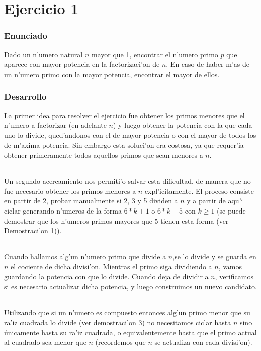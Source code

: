 \part{Ejercicio 1}
\section{Enunciado}
Dado un n'umero natural $n$ mayor que 1, encontrar el n'umero primo $p$ que aparece con mayor potencia en la factorizaci'on 
de $n$. En caso de haber m'as de un n'umero primo con  la mayor potencia, encontrar el mayor de ellos.

\section{Desarrollo}
La primer idea para resolver el ejercicio fue obtener los primos menores que el n'umero a factorizar
(en adelante $n$) y luego obtener la potencia con la que cada uno lo divide, qued'andonos con el de mayor
potencia o con el mayor de todos los de m'axima potencia. Sin embargo esta soluci'on era costosa, ya que
requer'ia obtener primeramente todos aquellos primos que sean menores a $n$.
\paragraph{}
Un segundo acercamiento nos permiti'o salvar esta dificultad, de manera que no fue necesario obtener 
los primos menores a $n$ expl'icitamente. El proceso consiste en partir de 2, probar manualmente si 2, 3 y 5 
dividen a $n$ y a partir  de aqu'i ciclar generando n'umeros de la forma $6*k + 1$ o $6*k + 5$ con $k \geq 1$ 
(se puede demostrar que los n'umeros primos mayores que 5 tienen esta forma (ver Demostraci'on 1)).
\paragraph{}
Cuando hallamos alg'un n'umero primo que divide a $n$,se lo divide y se guarda en $n$ el cociente de dicha 
divisi'on. Mientras el primo siga dividiendo a $n$, vamos guardando la potencia con que lo divide. 
Cuando deja de dividir a $n$, verificamos si es necesario actualizar dicha potencia, y luego construimos 
un nuevo candidato. 
\paragraph{}
Utilizando que si un n'umero es compuesto entonces alg'un primo menor que su ra'iz cuadrada lo divide 
(ver demostraci'on 3) no necesitamos ciclar hasta $n$ sino únicamente hasta su ra'iz cuadrada, o equivalentemente
hasta que el primo actual al cuadrado sea menor que $n$ (recordemos que $n$ se actualiza con cada divisi'on).
